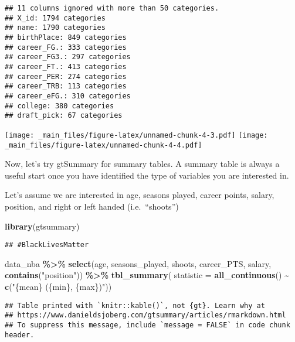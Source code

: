 \documentclass[
]{book}
\newenvironment{Shaded}{\begin{snugshade}}{\end{snugshade}}
\newcommand{\AttributeTok}[1]{\textcolor[rgb]{0.13,0.29,0.53}{#1}}
\newcommand{\FunctionTok}[1]{\textcolor[rgb]{0.13,0.29,0.53}{\textbf{#1}}}
\newcommand{\NormalTok}[1]{#1}
\newcommand{\SpecialCharTok}[1]{\textcolor[rgb]{0.81,0.36,0.00}{\textbf{#1}}}
\newcommand{\StringTok}[1]{\textcolor[rgb]{0.31,0.60,0.02}{#1}}
\begin{document}
\begin{verbatim}
## 11 columns ignored with more than 50 categories.
## X_id: 1794 categories
## name: 1790 categories
## birthPlace: 849 categories
## career_FG.: 333 categories
## career_FG3.: 297 categories
## career_FT.: 413 categories
## career_PER: 274 categories
## career_TRB: 113 categories
## career_eFG.: 310 categories
## college: 380 categories
## draft_pick: 67 categories
\end{verbatim}

\texttt{[image: \_main\_files/figure-latex/unnamed-chunk-4-3.pdf]} \texttt{[image: \_main\_files/figure-latex/unnamed-chunk-4-4.pdf]}

Now, let's try gtSummary for summary tables. A summary table is always a useful start once you have identified the type of variables you are interested in.

Let's assume we are interested in age, seasons played, career points, salary,
position, and right or left handed (i.e.~``shoots'')

\begin{Shaded}
\begin{Highlighting}[]
\FunctionTok{library}\NormalTok{(gtsummary)}
\end{Highlighting}
\end{Shaded}

\begin{verbatim}
## #BlackLivesMatter
\end{verbatim}

\begin{Shaded}
\begin{Highlighting}[]
\NormalTok{data\_nba }\SpecialCharTok{\%\textgreater{}\%} 
  \FunctionTok{select}\NormalTok{(age, seasons\_played, shoots, career\_PTS, salary, }\FunctionTok{contains}\NormalTok{(}\StringTok{"position"}\NormalTok{)) }\SpecialCharTok{\%\textgreater{}\%}
         \FunctionTok{tbl\_summary}\NormalTok{(}
           \AttributeTok{statistic =} \FunctionTok{all\_continuous}\NormalTok{() }\SpecialCharTok{\textasciitilde{}} \FunctionTok{c}\NormalTok{(}\StringTok{"\{mean\} (\{min\}, \{max\})"}\NormalTok{)) }
\end{Highlighting}
\end{Shaded}

\begin{verbatim}
## Table printed with `knitr::kable()`, not {gt}. Learn why at
## https://www.danieldsjoberg.com/gtsummary/articles/rmarkdown.html
## To suppress this message, include `message = FALSE` in code chunk header.
\end{verbatim}
\end{document}
